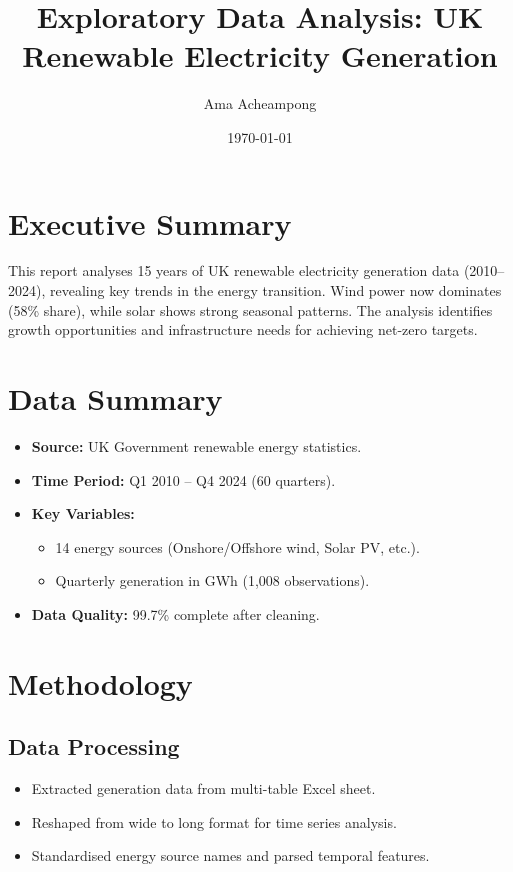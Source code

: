 \documentclass[11pt]{article}
\title{\color{titleblue}\textbf{Exploratory Data Analysis: UK Renewable Electricity Generation}}
\author{Ama Acheampong}
\date{\today}
\begin{document}
\maketitle

\section*{Executive Summary}
This report analyses 15 years of UK renewable electricity generation data (2010--2024), revealing key trends in the energy transition. Wind power now dominates (58\% share), while solar shows strong seasonal patterns. The analysis identifies growth opportunities and infrastructure needs for achieving net-zero targets.

\section{Data Summary}
\begin{itemize}
  \item \textbf{Source:} UK Government renewable energy statistics.
  \item \textbf{Time Period:} Q1 2010 -- Q4 2024 (60 quarters).
  \item \textbf{Key Variables:}
    \begin{itemize}
      \item 14 energy sources (Onshore/Offshore wind, Solar PV, etc.).
      \item Quarterly generation in GWh (1,008 observations).
    \end{itemize}
  \item \textbf{Data Quality:} 99.7\% complete after cleaning.
\end{itemize}

\section{Methodology}
\subsection{Data Processing}
\begin{itemize}
  \item Extracted generation data from multi-table Excel sheet.
  \item Reshaped from wide to long format for time series analysis.
  \item Standardised energy source names and parsed temporal features.
\end{itemize}
\end{document}

